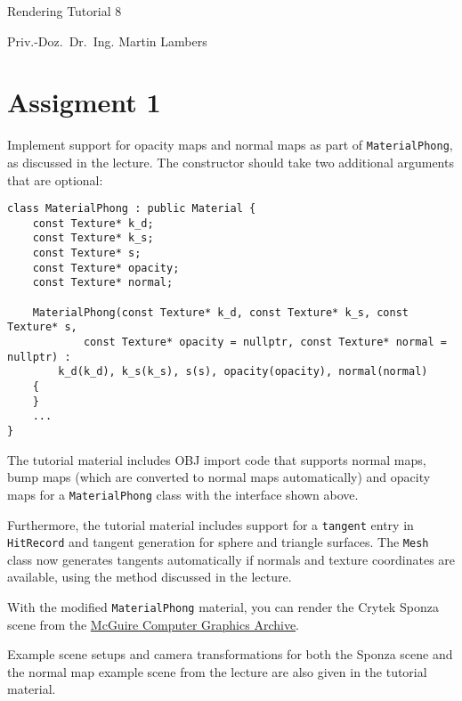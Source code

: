 \documentclass[a4paper,11pt]{article}
\newcommand{\authortitle}{Priv.-Doz.~Dr.~Ing.}
\newcommand{\authorname}{Martin Lambers}
\newcommand{\course}{Rendering}
\newcommand{\tutorial}{Tutorial 8}
\newcommand{\code}[1]{\texttt{#1}}
\begin{document}
\thispagestyle{empty}

\LARGE

\centerline{\course{} \tutorial}

\vspace{1ex}

\normalsize

\centerline{\authortitle{} \authorname}


\section*{Assigment 1}

Implement support for opacity maps and normal maps as part of
\code{MaterialPhong}, as discussed in the lecture. The 
constructor should take two additional arguments that are optional:
\begin{lstlisting}
class MaterialPhong : public Material {
    const Texture* k_d;
    const Texture* k_s;
    const Texture* s;
    const Texture* opacity;
    const Texture* normal;

    MaterialPhong(const Texture* k_d, const Texture* k_s, const Texture* s,
            const Texture* opacity = nullptr, const Texture* normal = nullptr) :
        k_d(k_d), k_s(k_s), s(s), opacity(opacity), normal(normal)
    {
    }
    ...
}
\end{lstlisting}

The tutorial material includes OBJ import code that supports normal maps, bump
maps (which are converted to normal maps automatically) and opacity maps for a
\code{MaterialPhong} class with the interface shown above.

Furthermore, the tutorial material includes support for a \code{tangent} entry
in \code{HitRecord} and tangent generation for sphere and triangle surfaces.
The \code{Mesh} class now generates tangents automatically if normals and texture coordinates
are available, using the method discussed in the lecture.

With the modified \code{MaterialPhong} material, you can render the
Crytek Sponza scene from the \href{https://casual-effects.com/data/}{McGuire
Computer Graphics Archive}.

Example scene setups and camera transformations for both the Sponza scene and
the normal map example scene from the lecture are also given in the tutorial
material.
\end{document}
